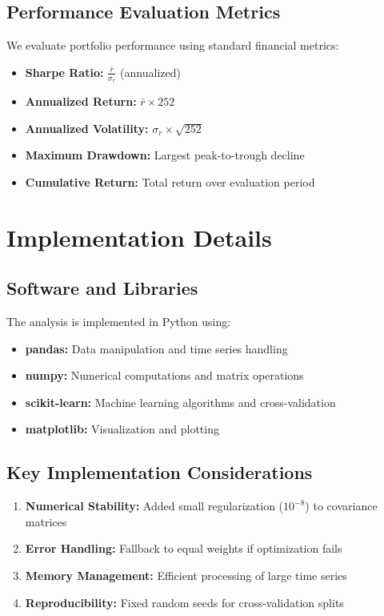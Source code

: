 \documentclass[12pt]{article}
\begin{document}
\subsection{Performance Evaluation Metrics}
We evaluate portfolio performance using standard financial metrics:

\begin{itemize}
    \item \textbf{Sharpe Ratio:} $\frac{\bar{r}}{\sigma_r}$ (annualized)
    \item \textbf{Annualized Return:} $\bar{r} \times 252$
    \item \textbf{Annualized Volatility:} $\sigma_r \times \sqrt{252}$
    \item \textbf{Maximum Drawdown:} Largest peak-to-trough decline
    \item \textbf{Cumulative Return:} Total return over evaluation period
\end{itemize}

\section{Implementation Details}

\subsection{Software and Libraries}
The analysis is implemented in Python using:
\begin{itemize}
    \item \textbf{pandas:} Data manipulation and time series handling
    \item \textbf{numpy:} Numerical computations and matrix operations
    \item \textbf{scikit-learn:} Machine learning algorithms and cross-validation
    \item \textbf{matplotlib:} Visualization and plotting
\end{itemize}

\subsection{Key Implementation Considerations}
\begin{enumerate}
    \item \textbf{Numerical Stability:} Added small regularization ($10^{-8}$) to covariance matrices
    \item \textbf{Error Handling:} Fallback to equal weights if optimization fails
    \item \textbf{Memory Management:} Efficient processing of large time series
    \item \textbf{Reproducibility:} Fixed random seeds for cross-validation splits
\end{enumerate}
\end{document}

